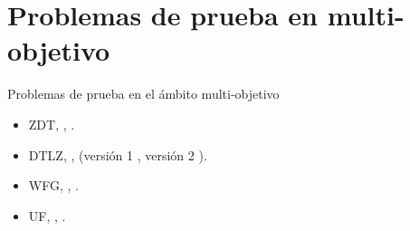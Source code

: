 \documentclass{beamer}
\begin{document}
\section{Problemas de prueba en multi-objetivo}
\begin{frame}{Problemas de prueba en el ámbito multi-objetivo}
\begin{itemize}
   \item ZDT, \citeauthor{Joel:ZDT}, \citeyear{Joel:ZDT}.%
   \item DTLZ, \citeauthor{Joel:DTLZ_1}, (versión 1 \citeyear{Joel:DTLZ_1}, versión 2 \citeyear{Joel:DTLZ_2}).%
   \item WFG, \citeauthor{Joel:WFG_Main}, \citeyear{Joel:WFG_Main}.%
   \item UF, \citeauthor{Joel:CEC2009}, \citeyear{Joel:CEC2009}.%
\end{itemize}
\end{frame}
\end{document}
